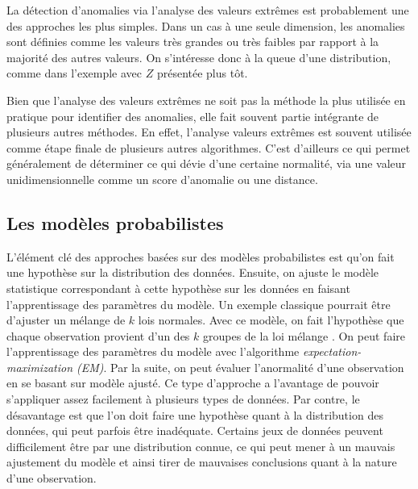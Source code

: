 La détection d'anomalies via l'analyse des valeurs extrêmes est probablement une des approches les plus simples. Dans un cas à une seule dimension, les anomalies sont définies comme les valeurs très grandes ou très faibles par rapport à la majorité des autres valeurs. On s'intéresse donc à la queue d'une distribution, comme dans l'exemple avec \DIFdelbegin {}\DIFdelend \DIFaddbegin {}\DIFaddend $Z$ \DIFdelbegin {}\DIFdelend présentée plus tôt\DIFdelbegin {}\DIFdelend . 

Bien que l'analyse des valeurs extrêmes ne soit pas la méthode la plus utilisée en pratique pour identifier des anomalies, elle fait souvent partie intégrante de plusieurs autres méthodes. En effet, l'analyse \DIFdelbegin {}\DIFdelend \DIFaddbegin {}\DIFaddend valeurs extrêmes est souvent utilisée comme étape finale de plusieurs autres algorithmes. C'est d'ailleurs ce qui permet généralement de déterminer ce qui dévie d'une certaine normalité, via une valeur unidimensionnelle comme un score d'anomalie ou une distance.


\subsection{Les modèles probabilistes}

L'élément clé des approches basées sur des modèles probabilistes  est qu'on fait une hypothèse sur la distribution des données. Ensuite, on ajuste le modèle statistique correspondant à cette hypothèse sur les données en faisant l'apprentissage des paramètres du modèle. Un exemple classique pourrait être d'ajuster un mélange de $k$ lois normales. Avec ce modèle, on fait l'hypothèse que chaque observation provient d'un des $k$ groupes de la loi mélange \DIFaddbegin {}\DIFaddend . On peut faire l'apprentissage des paramètres du modèle avec l'algorithme \textit{expectation-maximization (EM)}. Par la suite, on peut évaluer l'anormalité d'une observation en se basant sur \DIFdelbegin {}\DIFdelend \DIFaddbegin {}\DIFaddend modèle ajusté. Ce type d'approche a l'avantage de pouvoir s'appliquer assez facilement à plusieurs types de données. Par contre, le désavantage est que l'on doit faire une hypothèse quant à la distribution des données, qui peut parfois être inadéquate. Certains jeux de données peuvent difficilement être \DIFdelbegin {}\DIFdelend \DIFaddbegin {}\DIFaddend par une distribution connue, ce qui peut mener à un mauvais ajustement du modèle et ainsi tirer de mauvaises conclusions quant à la nature d'une observation.

